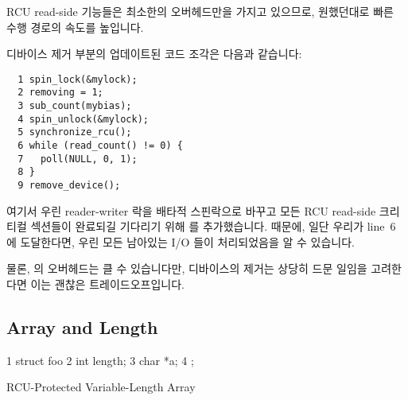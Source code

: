 RCU read-side 기능들은 최소한의 오버헤드만을 가지고 있으므로, 원했던대로 빠른
수행 경로의 속도를 높입니다.

디바이스 제거 부분의 업데이트된 코드 조각은 다음과 같습니다:
\iffalse

The RCU read-side primitives have minimal overhead, thus speeding up
the fastpath, as desired.

The updated code fragment removing a device is as follows:
\fi

\vspace{5pt}
\begin{minipage}[t]{\columnwidth}
\small
\begin{verbatim}
  1 spin_lock(&mylock);
  2 removing = 1;
  3 sub_count(mybias);
  4 spin_unlock(&mylock);
  5 synchronize_rcu();
  6 while (read_count() != 0) {
  7   poll(NULL, 0, 1);
  8 }
  9 remove_device();
\end{verbatim}
\end{minipage}
\vspace{5pt}

여기서 우린 reader-writer 락을 배타적 스핀락으로 바꾸고 모든 RCU read-side
크리티컬 섹션들이 완료되길 기다리기 위해  를
추가했습니다.
 때문에, 일단 우리가 line~6 에 도달한다면, 우린 모든
남아있는 I/O 들이 처리되었음을 알 수 있습니다.

물론,  의 오버헤드는 클 수 있습니다만, 디바이스의 제거는
상당히 드문 일임을 고려한다면 이는 괜찮은 트레이드오프입니다.
\iffalse

Here we replace the reader-writer lock with an exclusive spinlock and
add a \co{synchronize_rcu()} to wait for all of the RCU read-side
critical sections to complete.
Because of the \co{synchronize_rcu()},
once we reach line~6, we know that all remaining I/Os have been accounted
for.

Of course, the overhead of \co{synchronize_rcu()} can be large,
but given that device removal is quite rare, this is usually a good
tradeoff.
\fi

\subsection{Array and Length}
\label{sec:together:Array and Length}

\begin{listing}[tbp]
{ \scriptsize
\begin{verbbox}
 1 struct foo {
 2   int length;
 3   char *a;
 4 };
\end{verbbox}
}
\centering
\theverbbox
\caption{RCU-Protected Variable-Length Array}
\label{lst:together:RCU-Protected Variable-Length Array}
\end{listing}

